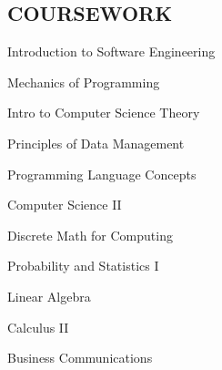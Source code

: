 \begin{resume}
\section{COURSEWORK}


      \begin{enumerate*}[series=MyList, before=\hspace{-0.6ex}, label=\textbullet]
        \item Introduction to Software Engineering
        \item Mechanics of Programming
        \item Intro to Computer Science Theory
        \item Principles of Data Management
        \item Programming Language Concepts
        \item Computer Science II
        \item Discrete Math for Computing
        \item Probability and Statistics I
        \item Linear Algebra
        \item Calculus II
        \item Business Communications
      \end{enumerate*}


 
\end{resume}
